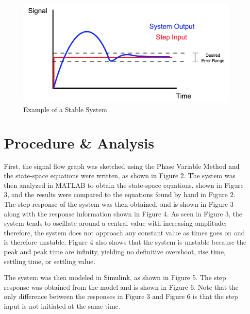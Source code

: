 \documentclass[12pt]{article}
\begin{document}
\begin{figure}[htbp] %
   \centering
   \includegraphics[width=4.5in]{stable_system.jpg} 
   \caption{Example of a Stable System}
   \label{fig:example}
\end{figure}


\newpage

\section*{\fontsize{12}{12}\selectfont \large Procedure \& Analysis}
First, the signal flow graph was sketched using the Phase Variable Method and the state-space equations were written, as shown in Figure 2. The system was then analyzed in MATLAB to obtain the state-space equations, shown in Figure 3, and the results were compared to the equations found by hand in Figure 2. The step response of the system was then obtained, and is shown in Figure 3 along with the response information shown in Figure 4. As seen in Figure 3, the system tends to oscillate around a central value with increasing amplitude; therefore, the system does not approach any constant value as times goes on and is therefore unstable. Figure 4 also shows that the system is unstable because the peak and peak time are infinity, yielding no definitive overshoot, rise time, settling time, or settling value.
\bigskip

The system was then modeled in Simulink, as shown in Figure 5. The step response was obtained from the model and is shown in Figure 6. Note that the only difference between the responses in Figure 3 and Figure 6 is that the step input is not initiated at the same time. 
\bigskip
\bigskip

\end{document}
